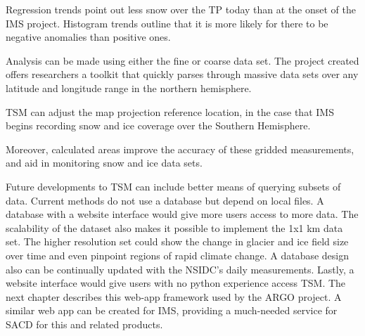 Regression trends point out less snow over the TP today than at the onset of the IMS project. Histogram trends outline that it is more likely for there to be negative anomalies than positive ones.

Analysis can be made using either the fine or coarse data set. The project created offers researchers a toolkit that quickly parses through massive data sets over any latitude and longitude range in the northern hemisphere. 

TSM can adjust the map projection reference location, in the case that IMS begins recording snow and ice coverage over the Southern Hemisphere.

Moreover, calculated areas improve the accuracy of these gridded measurements, and aid in monitoring snow and ice data sets. 

Future developments to TSM can include better means of querying subsets of data. Current methods do not use a database but depend on local files. A database with a website interface would give more users access to more data. The scalability of the dataset also makes it possible to implement the 1x1 km data set. The higher resolution set could show the change in glacier and ice field size over time and even pinpoint regions of rapid climate change. A database design also can be continually updated with the NSIDC's daily measurements. Lastly, a website interface would give users with no python experience access TSM. The next chapter describes this web-app framework used by the ARGO project. A similar web app can be created for IMS, providing a much-needed service for SACD for this and related products.